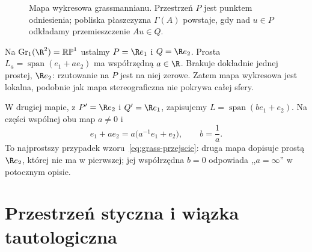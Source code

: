 \begin{figure}[!htbp]
\centering
{}
\caption{Mapa wykresowa grassmannianu. Przestrzeń $P$ jest
punktem odniesienia; pobliska płaszczyzna $\Gamma(A)$ powstaje,
gdy nad $u\in P$ odkładamy przemieszczenie $Au\in Q$.}
\label{fig:grass-wykres}
\end{figure}

\begin{przyklad}
\label{prz:grass-rp1-mapy}
Na $\operatorname{Gr}_1(\R^2)=\mathbb{RP}^1$ ustalmy
$P=\R e_1$ i $Q=\R e_2$. Prosta
$L_a=\operatorname{span}(e_1+ae_2)$ ma współrzędną
$a\in\R$. Brakuje dokładnie jednej prostej, $\R e_2$:
rzutowanie na $P$ jest na niej zerowe. Zatem mapa
wykresowa jest lokalna, podobnie jak mapa stereograficzna
nie pokrywa całej sfery.

W drugiej mapie, z $P'=\R e_2$ i $Q'=\R e_1$,
zapisujemy $L=\operatorname{span}(be_1+e_2)$.
Na części wspólnej obu map $a\ne0$ i
\[
 e_1+ae_2=a\bigl(a^{-1}e_1+e_2\bigr),
 \qquad b=\frac1a.
\]
To najprostszy przypadek wzoru~\eqref{eq:grass-przejscie}:
druga mapa dopisuje prostą $\R e_2$, której nie ma
w pierwszej; jej współrzędna $b=0$ odpowiada
,,$a=\infty$'' w potocznym opisie.
\end{przyklad}

\section{Przestrzeń styczna i wiązka tautologiczna}
\label{sec:grass-styczna}

